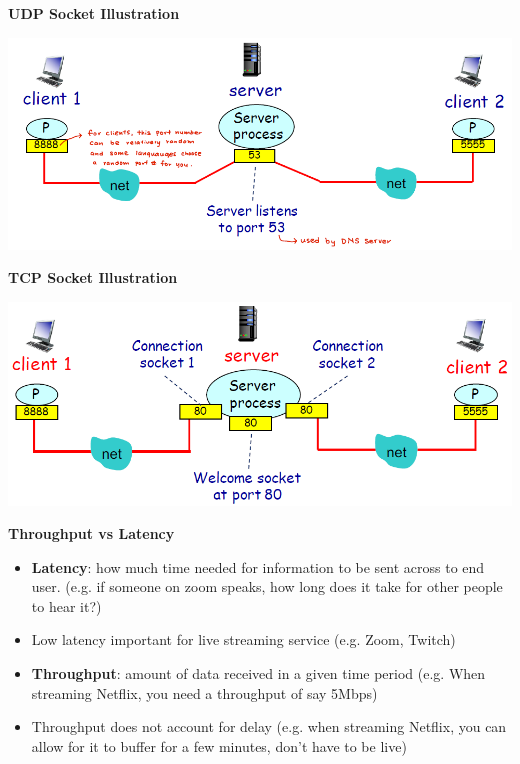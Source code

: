 \documentclass[10pt,landscape,a4paper]{article}
\begin{document}
\begin{multicols*}{4}
        \textbf{UDP Socket Illustration}
        \begin{center}
            \includegraphics[width=0.9\columnwidth]{udp_socket}
        \end{center}
        \textbf{TCP Socket Illustration}
        \begin{center}
            \includegraphics[width=0.9\columnwidth]{tcp_socket}
        \end{center}
        \textbf{Throughput vs Latency}
        \begin{itemize}
            \item \textbf{Latency}: how much time needed for information to be sent across to end user. (e.g. if someone on zoom speaks, how long does it take for other people to hear it?)
            \item Low latency important for live streaming service (e.g. Zoom, Twitch)
            \item \textbf{Throughput}: amount of data received in a given time period (e.g. When streaming Netflix, you need a throughput of say 5Mbps)
            \item Throughput does not account for delay (e.g. when streaming Netflix, you can allow for it to buffer for a few minutes, don't have to be live)
        \end{itemize}
    \end{multicols*}
\end{document}
